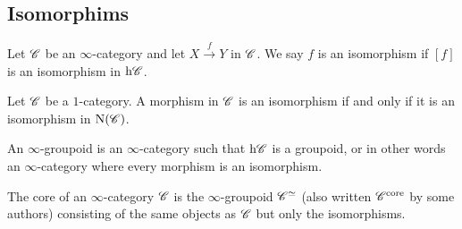 \documentclass[../../thesis.tex]{subfiles}
\begin{document}
\subsection{Isomorphims}
\begin{definition}
    Let $\mathscr{C}$ be an $\infty$-category and let $X\xrightarrow{f}Y$ in $\mathscr{C}$.
    We say $f$ is an isomorphism if $[f]$ is an isomorphism in $\mathrm{h}\mathscr{C}$.
\end{definition}
\begin{example}
    Let $\mathscr{C}$ be a $1$-category.
    A morphism in $\mathscr{C}$ is an isomorphism if and only if it is an isomorphism in $\mathrm{N}(\mathscr{C})$.
\end{example}
\begin{definition}
    An $\infty$-groupoid is an $\infty$-category such that $\mathrm{h}\mathscr{C}$ is a groupoid, or in other words an $\infty$-category where every morphism is an isomorphism.
\end{definition}
\begin{definition}
    The core of an $\infty$-category $\mathscr{C}$ is the $\infty$-groupoid $\mathscr{C}^{\simeq}$ (also written $\mathscr{C}^{\text{core}}$ by some authors) consisting of the same objects as $\mathscr{C}$ but only the isomorphisms.
\end{definition}
\end{document}
